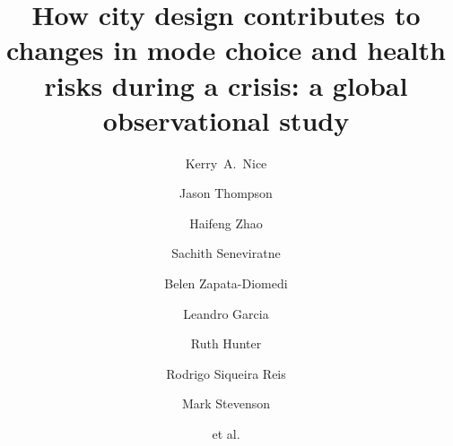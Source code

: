 \documentclass[preprint,12pt]{elsarticle}
\begin{document}
\begin{frontmatter}



\title{How city design contributes to changes in mode choice and health risks during a crisis: a global observational study}


\author[melb]{Kerry~A.~Nice}
\author[melb]{Jason Thompson}
\author[melb]{Haifeng Zhao}
\author[melb]{Sachith Seneviratne}
\author[RMII]{Belen Zapata-Diomedi}
\author[Belfast]{Leandro Garcia}
\author[Belfast]{Ruth Hunter}
\author[wash]{Rodrigo Siqueira Reis}
\author[melb,eng]{Mark Stevenson}
\author[melb]{et al.}

\address[melb]{Transport, Health, and Urban Design Research Lab, Faculty of Architecture, Building, and Planning, University of Melbourne, VIC, Australia.}
\address[RMII]{Healthy Liveable Cities Group, Centre for Urban Research, RMIT University, Melbourne, Australia.}
\address[Belfast]{Centre for Public Health, Queen’s University Belfast, Institute of Clinical Sciences B, Belfast, Northern Ireland, UK.}
\address[wash]{Washington University, St. Louis, Missouri, US.}
\address[eng]{Melbourne School of Engineering; and Melbourne School of Population and Global Health, University of Melbourne, VIC, Australia.}


\end{frontmatter}
\end{document}
